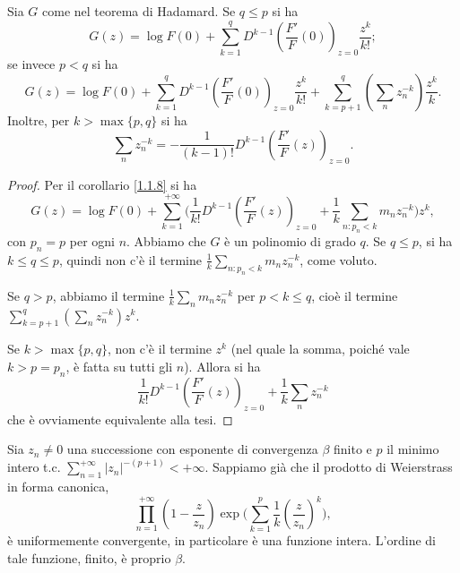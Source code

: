 \begin{cor} \label{1.2.14}
  Sia $G$ come nel teorema di Hadamard. Se $q \le p$ si ha
  $$G(z)=\log{F(0)}+\sum_{k=1}^q D^{k-1}\left(\frac{F'}{F}(0)\right)_{z=0} \frac{z^k}{k!};$$
  se invece $p<q$ si ha
  $$G(z)=\log{F(0)}+\sum_{k=1}^q D^{k-1}\left(\frac{F'}{F}(0)\right)_{z=0}\frac{z^k}{k!}+\sum_{k=p+1}^q\left(\sum_n z_n^{-k}\right)\frac{z^k}{k}.$$
  Inoltre, per $k>\max\{p,q\}$ si ha
  $$\sum_n z_n^{-k}=-\frac{1}{(k-1)!}D^{k-1}\left(\frac{F'}{F}(z)\right)_{z=0}.$$
\end{cor}

\begin{proof}
  Per il corollario \ref{1.1.8} si ha
  $$G(z)=\log{F(0)}+\sum_{k=1}^{+\infty}\Bigg(\frac{1}{k!}D^{k-1}\left(\frac{F'}{F}(z)\right)_{z=0}+\frac{1}{k}\sum_{n:p_n<k}m_nz_n^{-k}\Bigg)z^k,$$
  con $p_n=p$ per ogni $n$. Abbiamo che $G$ è un polinomio di grado $q$. Se $q \le p$, si ha $k \le q \le p$, quindi non c'è il termine $\displaystyle \frac{1}{k}\sum_{n:p_n<k}m_nz_n^{-k}$, come voluto.

  Se $q>p$, abbiamo il termine $\displaystyle \frac{1}{k}\sum_n m_nz_n^{-k}$ per $p<k \le q$, cioè il termine $\displaystyle \sum_{k=p+1}^q\left(\sum_n z_n^{-k}\right)z^k$.

  Se $k>\max\{p,q\}$, non c'è il termine $z^k$ (nel quale la somma, poiché vale $k>p=p_n$, è fatta su tutti gli $n$). Allora si ha
  $$\frac{1}{k!}D^{k-1}\left(\frac{F'}{F}(z)\right)_{z=0}+\frac{1}{k}\sum_n z_n^{-k}$$
  che è ovviamente equivalente alla tesi.
\end{proof}

\begin{thm} \label{1.2.15}
  Sia $z_n\not=0$ una successione con esponente di convergenza $\beta$ finito e $p$ il minimo intero t.c. $\displaystyle \sum_{n=1}^{+\infty} |z_n|^{-(p+1)}<+\infty$. Sappiamo già che il prodotto di Weierstrass in forma canonica,
  $$\prod_{n=1}^{+\infty} \left(1-\frac{z}{z_n}\right)\exp\Bigg(\sum_{k=1}^p\frac{1}{k}\left(\frac{z}{z_n}\right)^k\Bigg),$$
  è uniformemente convergente, in particolare è una funzione intera. L'ordine di tale funzione, finito, è proprio $\beta$.
\end{thm}

